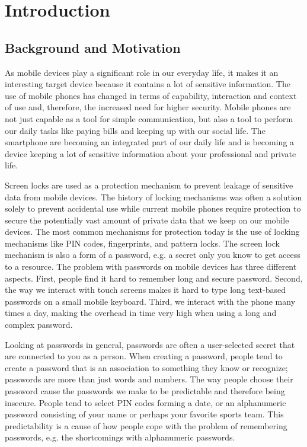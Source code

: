 \chapter{Introduction}\label{chap:introduction}
	
	\section{Background and Motivation} \label{sec:backgroundandmotivation}

		As mobile devices play a significant role in our everyday life, it makes it an interesting target device because it contains a lot of sensitive information. The use of mobile phones has changed in terms of capability, interaction and context of use and, therefore, the increased need for higher security. Mobile phones are not just capable as a tool for simple communication, but also a tool to perform our daily tasks like paying bills and keeping up with our social life. The smartphone are becoming an integrated part of our daily life and is becoming a device keeping a lot of sensitive information about your professional and private life.

		Screen locks are used as a protection mechanism to prevent leakage of sensitive data from mobile devices. The history of locking mechanisms was often a solution solely to prevent accidental use while current mobile phones require protection to secure the potentially vast amount of private data that we keep on our mobile devices. The most common mechanisms for protection today is the use of locking mechanisms like PIN codes, fingerprints, and pattern locks. The screen lock mechanism is also a form of a password, e.g. a secret only you know to get access to a resource. The problem with passwords on mobile devices has three different aspects. First, people find it hard to remember long and secure password. Second, the way we interact with touch screens makes it hard to type long text-based passwords on a small mobile keyboard. Third, we interact with the phone many times a day, making the overhead in time very high when using a long and complex password.

		Looking at passwords in general, passwords are often a user-selected secret that are connected to you as a person. When creating a password, people tend to create a password that is an association to something they know or recognize; passwords are more than just words and numbers. The way people choose their password cause the passwords we make to be predictable and therefore being insecure. People tend to select PIN codes forming a date, or an alphanumeric password consisting of your name or perhaps your favorite sports team. This predictability is a cause of how people cope with the problem of remembering passwords, e.g. the shortcomings with alphanumeric passwords. 

